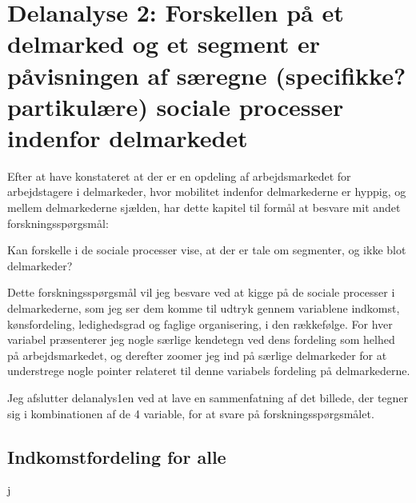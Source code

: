 




\chapter{Delanalyse 2: Forskellen på et delmarked og et segment er påvisningen af særegne (specifikke? partikulære) sociale processer indenfor delmarkedet \label{kapitel_delanalyse2_socialeprocesser}}

Efter at have konstateret at der er en opdeling af arbejdsmarkedet for arbejdstagere i delmarkeder, hvor mobilitet indenfor delmarkederne er hyppig, og mellem delmarkederne sjælden, har dette kapitel til formål at besvare mit andet forskningsspørgsmål:

\begin{tcolorbox}[title=Forskningspørgsmål 2,
subtitle style={boxrule=0.4pt} ]
  Kan forskelle i de sociale processer vise, at der er tale om segmenter, og ikke blot delmarkeder?
\end{tcolorbox}

Dette forskningsspørgsmål vil jeg besvare ved at kigge på de sociale processer i delmarkederne, som jeg ser dem komme til udtryk gennem variablene indkomst, kønsfordeling, ledighedsgrad og faglige organisering, i den rækkefølge. For hver variabel præsenterer jeg nogle særlige kendetegn ved dens fordeling som helhed på arbejdsmarkedet, og derefter zoomer jeg ind på særlige delmarkeder for at understrege nogle pointer relateret til denne variabels fordeling på delmarkederne.  

Jeg afslutter delanalys1en ved at lave en sammenfatning af det billede, der tegner sig i kombinationen af de 4 variable, for at svare på forskningsspørgsmålet. 


\section{Indkomstfordeling for alle \label{sec_delanalyse2_loen_alle}}

j


